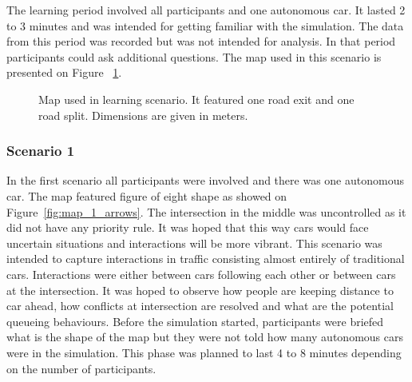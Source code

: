 \documentclass[11pt,english]{article}
\begin{document}
The learning period involved all participants and one autonomous car. It lasted 2 to 3 minutes and was intended for getting familiar with the simulation. The data from this period was recorded but was not intended for analysis. In that period participants could ask additional questions. The map used in this scenario is presented on Figure ~\ref{fig:map_0_arrows}.


\begin{figure}[] %
\caption{Map used in learning scenario. It featured one road exit and one road split. Dimensions are given in meters.}
\label{fig:map_0_arrows}
\end{figure}


\subsubsection{Scenario 1}

In the first scenario all participants were involved and there was one autonomous car. The map featured figure of eight shape as showed on Figure~\ref{fig:map_1_arrows}. The intersection in the middle was uncontrolled as it did not have any priority rule. It was hoped that this way cars would face uncertain situations and interactions will be more vibrant. This scenario was intended to capture interactions in traffic consisting almost entirely of traditional cars. Interactions were either between cars following each other or between cars at the intersection. It was hoped to observe how people are keeping distance to car ahead, how conflicts at intersection are resolved and what are the potential queueing behaviours. Before the simulation started, participants were briefed what is the shape of the map but they were not told how many autonomous cars were in the simulation. This phase was planned to last 4 to 8 minutes depending on the number of participants.
\end{document}

